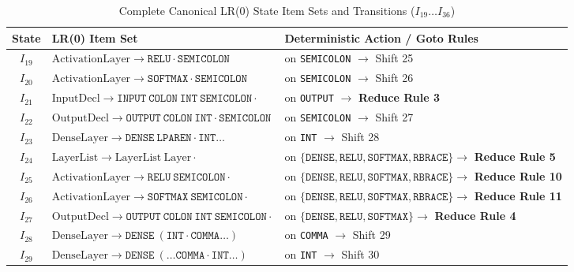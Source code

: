 \documentclass[11pt,a4paper]{article}
\begin{document}
\begin{table}[htbp]
\centering
\scriptsize
\caption{Complete Canonical LR(0) State Item Sets and Transitions ($I_{19} \dots I_{36}$)}
\label{tab:canonical_states_part2}
\begin{tabular}{cp{6.5cm}p{5.5cm}}
\toprule
\textbf{State} & \textbf{LR(0) Item Set} & \textbf{Deterministic Action / Goto Rules} \\
\midrule
$I_{19}$ & $\text{ActivationLayer} \rightarrow \texttt{RELU} \cdot \texttt{SEMICOLON}$ & on \texttt{SEMICOLON} $\rightarrow$ Shift 25 \\
$I_{20}$ & $\text{ActivationLayer} \rightarrow \texttt{SOFTMAX} \cdot \texttt{SEMICOLON}$ & on \texttt{SEMICOLON} $\rightarrow$ Shift 26 \\
$I_{21}$ & $\text{InputDecl} \rightarrow \texttt{INPUT} \ \texttt{COLON} \ \texttt{INT} \ \texttt{SEMICOLON} \cdot$ & on \texttt{OUTPUT} $\rightarrow$ \textbf{Reduce Rule 3} \\
$I_{22}$ & $\text{OutputDecl} \rightarrow \texttt{OUTPUT} \ \texttt{COLON} \ \texttt{INT} \cdot \texttt{SEMICOLON}$ & on \texttt{SEMICOLON} $\rightarrow$ Shift 27 \\
$I_{23}$ & $\text{DenseLayer} \rightarrow \texttt{DENSE} \ \texttt{LPAREN} \cdot \texttt{INT} \dots$ & on \texttt{INT} $\rightarrow$ Shift 28 \\
$I_{24}$ & $\text{LayerList} \rightarrow \text{LayerList} \ \text{Layer} \cdot$ & on $\{\texttt{DENSE}, \texttt{RELU}, \texttt{SOFTMAX}, \texttt{RBRACE}\} \rightarrow$ \textbf{Reduce Rule 5} \\
$I_{25}$ & $\text{ActivationLayer} \rightarrow \texttt{RELU} \ \texttt{SEMICOLON} \cdot$ & on $\{\texttt{DENSE}, \texttt{RELU}, \texttt{SOFTMAX}, \texttt{RBRACE}\} \rightarrow$ \textbf{Reduce Rule 10} \\
$I_{26}$ & $\text{ActivationLayer} \rightarrow \texttt{SOFTMAX} \ \texttt{SEMICOLON} \cdot$ & on $\{\texttt{DENSE}, \texttt{RELU}, \texttt{SOFTMAX}, \texttt{RBRACE}\} \rightarrow$ \textbf{Reduce Rule 11} \\
$I_{27}$ & $\text{OutputDecl} \rightarrow \texttt{OUTPUT} \ \texttt{COLON} \ \texttt{INT} \ \texttt{SEMICOLON} \cdot$ & on $\{\texttt{DENSE}, \texttt{RELU}, \texttt{SOFTMAX}\} \rightarrow$ \textbf{Reduce Rule 4} \\
$I_{28}$ & $\text{DenseLayer} \rightarrow \texttt{DENSE} \ (\texttt{INT} \cdot \texttt{COMMA} \dots)$ & on \texttt{COMMA} $\rightarrow$ Shift 29 \\
$I_{29}$ & $\text{DenseLayer} \rightarrow \texttt{DENSE} \ (\dots \texttt{COMMA} \cdot \texttt{INT} \dots)$ & on \texttt{INT} $\rightarrow$ Shift 30 \\

\end{tabular}
\end{table}
\end{document}
